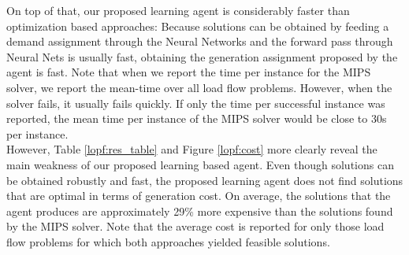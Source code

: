 On top of that, our proposed learning agent is considerably faster than optimization based approaches: Because solutions can be obtained by feeding a demand assignment through the Neural Networks and the forward pass through Neural Nets is usually fast, obtaining the generation assignment proposed by the agent is fast. Note that when we report the time per instance for the MIPS solver, we report the mean-time over all load flow problems. However, when the solver fails, it usually fails quickly. If only the time per successful instance was reported, the mean time per instance of the MIPS solver would be close to 30s per instance.\\
However, Table \ref{lopf:res_table} and Figure \ref{lopf:cost} more clearly reveal the main weakness of our proposed learning based agent. Even though solutions can be obtained robustly and fast, the proposed learning agent does not find solutions that are optimal in terms of generation cost. On average, the solutions that the agent produces are approximately 29\% more expensive than the solutions found by the MIPS solver. Note that the average cost is reported for only those load flow problems for which both approaches yielded feasible solutions.


